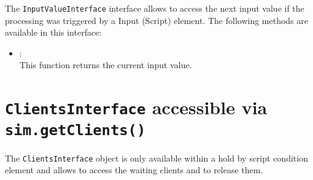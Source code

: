 The \texttt{InputValueInterface} interface allows to access the next input value
if the processing was triggered by a Input (Script) element.
The following methods are available in this interface:

\begin{itemize}
\item
{}:\\
This function returns the current input value.
\end{itemize}



\chapter{\texttt{ClientsInterface} accessible via \texttt{sim.getClients()}}

The \texttt{ClientsInterface} object is only available within a hold by script condition element
and allows to access the waiting clients and to release them.

